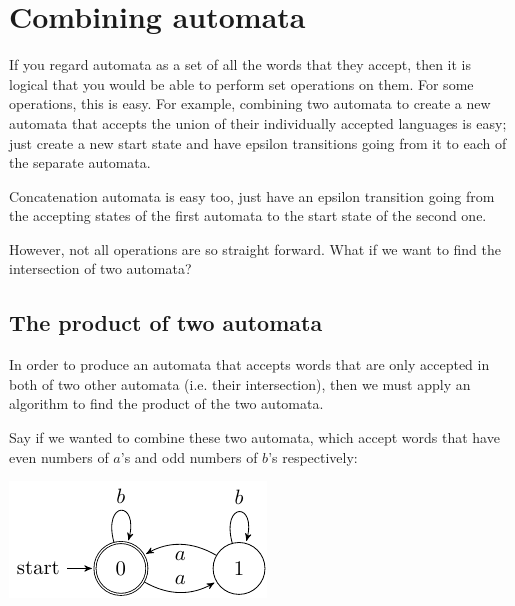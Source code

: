 

\section{Combining automata}

If you regard automata as a set of all the words that they accept, then it is
logical that you would be able to perform set operations on them. For some
operations, this is easy. For example, combining two automata to create a new
automata that accepts the union of their individually accepted languages is
easy; just create a new start state and have epsilon transitions going from it
to each of the separate automata.

Concatenation automata is easy too, just have an epsilon transition going from
the accepting states of the first automata to the start state of the second one.

However, not all operations are so straight forward. What if we want to find the
intersection of two automata?

\subsection{The product of two automata}
\label{sub:product_of_automata}

In order to produce an automata that accepts words that are only accepted in
both of two other automata (i.e. their intersection), then we must apply an
algorithm to find the product of the two automata.

Say if we wanted to combine these two automata, which accept words that have
even numbers of $a$'s and odd numbers of $b$'s respectively:

\begin{center}
  \includegraphics{automata/28.pdf}
\end{center}

